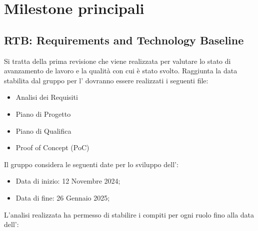 \section{Milestone principali}
\label{sec:milestone_principali}
\subsection{RTB: Requirements and Technology Baseline}
Si tratta della prima revisione che viene realizzata per valutare lo stato di avanzamento de lavoro e la qualità con cui è stato svolto.
Raggiunta la data stabilita dal gruppo per l' dovranno essere realizzati i seguenti file:

\begin{itemize}
\item Analisi dei Requisiti
\item Piano di Progetto
\item Piano di Qualifica
\item Proof of Concept (PoC)
\end{itemize}
Il gruppo considera le seguenti date per lo sviluppo dell':
\begin{itemize}
    \item Data di inizio: 12 Novembre 2024;
    \item Data di fine: 26 Gennaio 2025;
\end{itemize}
L'analisi realizzata ha permesso di stabilire i compiti per ogni ruolo fino alla data dell':
